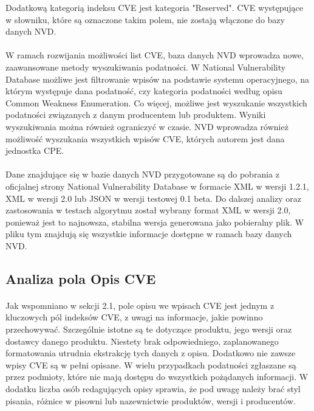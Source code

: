 \documentclass[a4paper,12pt,twoside]{article}
\begin{document}
Dodatkową kategorią indeksu CVE jest kategoria "Reserved". CVE występujące w słowniku, które są oznaczone takim polem, nie zostają włączone do bazy danych NVD\cite{nvd_official}.


\paragraph{}
W ramach rozwijania możliwości list CVE, baza danych NVD wprowadza nowe, zaawansowane metody wyszukiwania podatności. W National Vulnerability Database możliwe jest filtrowanie wpisów na podstawie systemu operacyjnego, na którym występuje dana podatność, czy kategoria podatności według opisu Common Weakness Enumeration. Co więcej, możliwe jest wyszukanie wszystkich podatności związanych z danym producentem lub produktem. Wyniki wyszukiwania można również ograniczyć w czasie. NVD wprowadza również możliwość wyszukania wszystkich wpisów CVE, których autorem jest dana jednostka CPE. 

\paragraph{}
Dane znajdujące się w bazie danych NVD  przygotowane są do pobrania z oficjalnej strony National Vulnerability Database w formacie XML w wersji 1.2.1, XML w wersji 2.0 lub JSON w wersji testowej 0.1 beta. Do dalszej analizy oraz zastosowania w testach algorytmu został wybrany format XML w wersji 2.0, ponieważ jest to najnowsza, stabilna wersja generowana jako pobieralny plik. W pliku tym znajdują się wszystkie informacje dostępne w ramach bazy danych NVD.

\subsection{Analiza pola Opis CVE}
\paragraph{}
Jak wspomniano w sekcji 2.1, pole opisu we wpisach CVE jest jednym z kluczowych pól indeksów CVE, z uwagi na informacje, jakie powinno przechowywać. Szczególnie istotne są te dotyczące produktu, jego wersji oraz dostawcy danego produktu. Niestety brak odpowiedniego, zaplanowanego formatowania utrudnia ekstrakcję tych danych z opisu. Dodatkowo nie zawsze wpisy CVE są w pełni opisane. W wielu przypadkach podatności zgłaszane są przez podmioty, które nie mają dostępu do wszystkich pożądanych informacji. W dodatku liczba osób redagujących opisy sprawia, że pod uwagę należy brać styl pisania, różnice w pisowni lub nazewnictwie produktów, wersji i producentów. 
\end{document}
